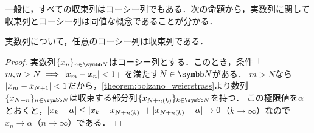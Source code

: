 \documentclass[../../main]{subfiles}
\begin{document}
一般に，すべての収束列はコーシー列でもある．次の命題から，実数列に関して収束列とコーシー列は同値な概念であることが分かる．

\begin{proposition}{}{}
  実数列について，任意のコーシー列は収束列である．
\end{proposition}

\begin{proof}
  実数列\(\seq{x_n}_{n\in\numset{N}}\)はコーシー列とする．このとき，条件「\(m,n>N\implies\lvert x_m-x_n\rvert<1\)」を満たす\(N\in\numset{N}\)がある．
  \(m>N\)なら\(\lvert x_m-x_{N+1}\rvert<1\)だから，\cref{theorem:bolzano_weierstrass}より数列\(\seq{x_{N+n}}_{n\in\numset{N}}\)は収束する部分列\(\seq{x_{N+n(k)}}_{k\in\numset{N}}\)を持つ．
  この極限値を\(\alpha\)とおくと，\(\lvert x_k-\alpha\rvert\leq\lvert x_k-x_{N+n(k)}\rvert+\lvert x_{N+n(k)}-\alpha\rvert\to 0\)（\(k\to\infty\)）なので\(x_n\to\alpha\)（\(n\to\infty\)）である．
\end{proof}
\end{document}
